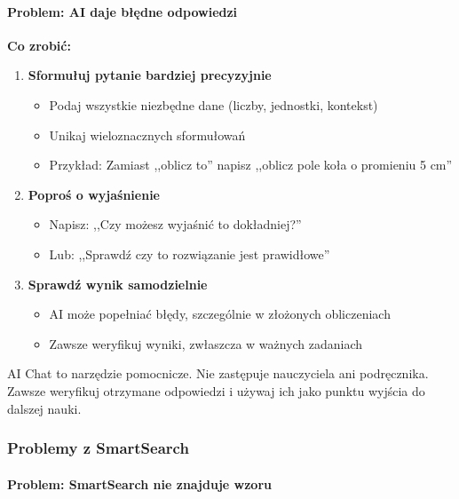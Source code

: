 \documentclass[12pt,a4paper]{article}
\begin{document}
\paragraph{Problem: AI daje błędne odpowiedzi}

\textbf{Co zrobić:}

\begin{enumerate}
    \item \textbf{Sformułuj pytanie bardziej precyzyjnie}
    \begin{itemize}
        \item Podaj wszystkie niezbędne dane (liczby, jednostki, kontekst)
        \item Unikaj wieloznacznych sformułowań
        \item Przykład: Zamiast ,,oblicz to'' napisz ,,oblicz pole koła o promieniu 5 cm''
    \end{itemize}
    
    \item \textbf{Poproś o wyjaśnienie}
    \begin{itemize}
        \item Napisz: ,,Czy możesz wyjaśnić to dokładniej?''
        \item Lub: ,,Sprawdź czy to rozwiązanie jest prawidłowe''
    \end{itemize}
    
    \item \textbf{Sprawdź wynik samodzielnie}
    \begin{itemize}
        \item AI może popełniać błędy, szczególnie w złożonych obliczeniach
        \item Zawsze weryfikuj wyniki, zwłaszcza w ważnych zadaniach
    \end{itemize}
\end{enumerate}

\begin{tcolorbox}[colback=yellow!10!white,colframe=orange!75!black,title=\faExclamationTriangle\ Ważne]
AI Chat to narzędzie pomocnicze. Nie zastępuje nauczyciela ani podręcznika. Zawsze weryfikuj otrzymane odpowiedzi i używaj ich jako punktu wyjścia do dalszej nauki.
\end{tcolorbox}

\subsubsection{Problemy z SmartSearch}

\paragraph{Problem: SmartSearch nie znajduje wzoru}
\end{document}
